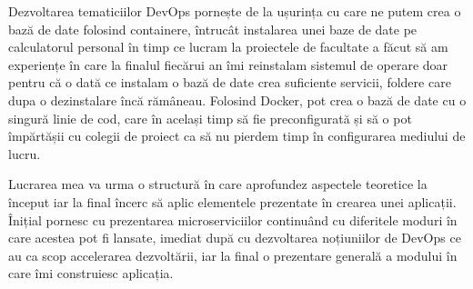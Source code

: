 Dezvoltarea tematiciilor DevOps pornește de la ușurința cu care ne putem crea o bază de date folosind containere,
întrucât instalarea unei baze de date pe calculatorul personal în timp ce lucram la proiectele de facultate a făcut
să am experiențe în care la finalul fiecărui an îmi reinstalam sistemul de operare doar pentru că o dată ce instalam
o bază de date crea suficiente servicii, foldere care dupa o dezinstalare încă rămâneau. Folosind Docker,
pot crea o bază de date cu o singură linie de cod, care în același timp să fie preconfigurată și să o pot
împărtășii cu colegii de proiect ca să nu pierdem timp în configurarea mediului de lucru. 

Lucrarea mea va urma o structură în care aprofundez aspectele teoretice la început iar la final încerc să
aplic elementele prezentate în crearea unei aplicații. Înițial pornesc cu prezentarea microserviciilor
continuând cu diferitele moduri în care acestea pot fi lansate, imediat după cu dezvoltarea noțiuniilor de DevOps
ce au ca scop accelerarea dezvoltării, iar la final o prezentare generală a modului în care îmi construiesc aplicația.
